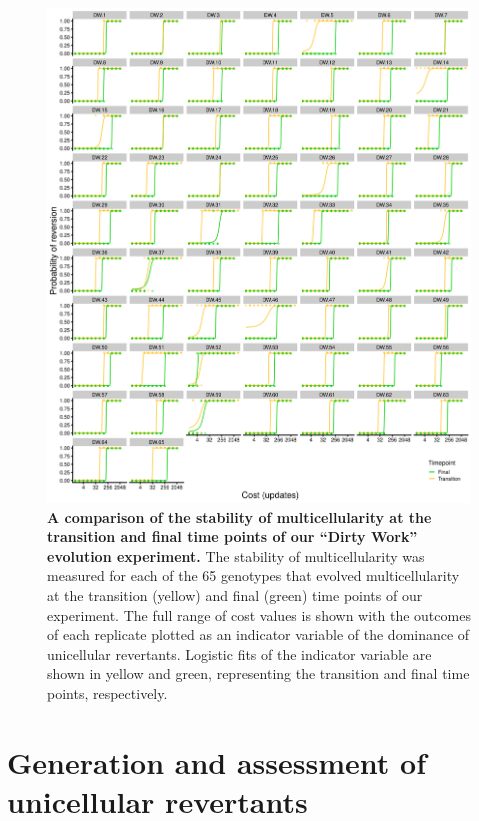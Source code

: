 \documentclass[
]{book}
\begin{document}
\begin{figure}
\centering
\includegraphics{images/Figure_S3_Dirty_work_Entrenchment_20DEC22.png}
\caption{\label{fig:dw-entrench-comparison}\textbf{A comparison of the stability of multicellularity at the transition and final time points of our ``Dirty Work'' evolution experiment.} The stability of multicellularity was measured for each of the 65 genotypes that evolved multicellularity at the transition (yellow) and final (green) time points of our experiment. The full range of cost values is shown with the outcomes of each replicate plotted as an indicator variable of the dominance of unicellular revertants. Logistic fits of the indicator variable are shown in yellow and green, representing the transition and final time points, respectively.}
\end{figure}

\hypertarget{generation-and-assessment-of-unicellular-revertants}{%
\chapter{Generation and assessment of unicellular revertants}\label{generation-and-assessment-of-unicellular-revertants}}
\end{document}
